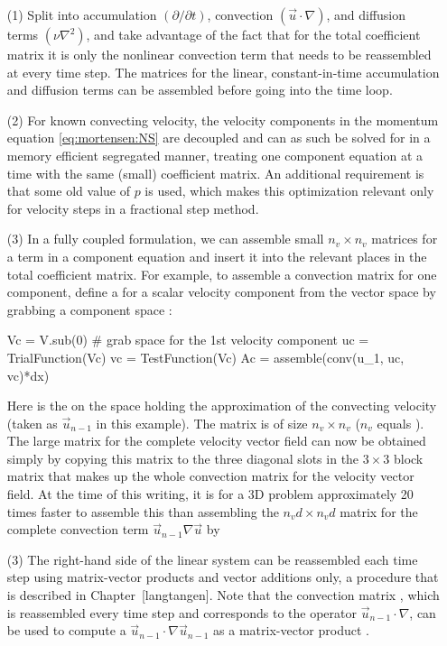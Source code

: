\begin{itemize}
 \item[(1)] Split  into accumulation $(\partial /\partial t)$,
   convection $(\vec{u}\cdot\nabla)$, and diffusion terms
   $(\nu\nabla^2)$, and take advantage of the fact that for the total
   coefficient matrix it is only the nonlinear convection term that
   needs to be reassembled at every time step. The matrices for the
   linear, constant-in-time accumulation and diffusion terms can be
   assembled before going into the time loop.

\item[(2)] For known convecting velocity, the velocity components in
  the momentum equation \eqref{eq:mortensen:NS} are decoupled and
  can as such be solved for in a memory efficient segregated manner,
  treating one component equation at a time with the same (small)
  coefficient matrix. An additional requirement is that some old value
  of $p$ is used, which makes this optimization relevant only for
  velocity steps in a fractional step method.

\item[(3)] In a fully coupled formulation, we can assemble small
  $n_v\times n_v$ matrices for a term in a component equation and
  insert it into the relevant places in the total coefficient matrix.
  For example, to assemble a convection matrix for one component,
  define a  for a scalar velocity component from
  the vector space  by grabbing a component space :
\begin{python}
Vc = V.sub(0)  # grab space for the 1st velocity component
uc = TrialFunction(Vc)
vc = TestFunction(Vc)
Ac = assemble(conv(u_1, uc, vc)*dx)
\end{python}
Here  is the  on the space  holding the
approximation of the convecting velocity (taken as $\vec{u}_{n-1}$ in
this example).  The matrix  is of size $n_v\times n_v$ ($n_v$
equals ).  The large matrix for the complete velocity
vector field can now be obtained simply by copying this 
matrix to the three diagonal slots in the $3\times 3$ block matrix
that makes up the whole convection matrix for the velocity vector
field.  At the time of this writing, it is for a 3D problem
approximately 20 times faster to assemble this  than
assembling the $n_vd\times n_vd$ matrix for the complete convection
term $\vec{u}_{n-1}\nabla \vec{u}$ by 

\item[(3)] The right-hand side of the linear system can be reassembled
  each time step using matrix-vector products and vector additions
  only, a procedure that is described in Chapter~[langtangen]. Note
  that the convection matrix , which is reassembled every time
  step and corresponds to the operator $\vec{u}_{n-1}\cdot\nabla$, can
  be used to compute a $\vec{u}_{n-1}\cdot\nabla\vec{u}_{n-1}$ as a
  matrix-vector product .


\end{itemize}
